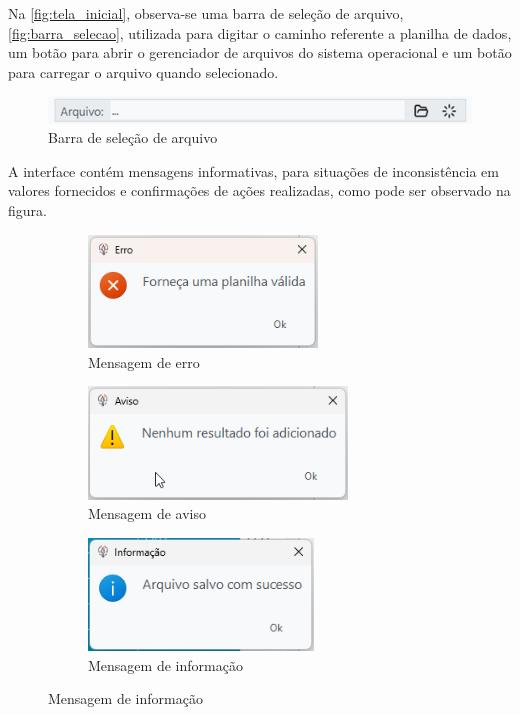 Na \autoref{fig:tela_inicial}, observa-se uma barra de seleção de arquivo, \autoref{fig:barra_selecao}, utilizada para digitar o caminho referente a planilha de dados, um botão para abrir o gerenciador de arquivos do sistema operacional e um botão para carregar o arquivo quando selecionado.

\begin{figure}[H]
	\centering
	\caption{Barra de seleção de arquivo}
	\label{fig:barra_selecao}
	\includegraphics[width=15cm]{illustrations/figures/barra_selecao.png}
\end{figure}

A interface contém mensagens informativas, para situações de inconsistência em valores fornecidos e confirmações de ações realizadas, como pode ser observado na figura.

\begin{figure}[H]
	\centering
	\caption{Mensagens informativas}
  \label{fig:mensagens_informativas}
	\begin{subfigure}{7.5cm}
		\centering
		\includegraphics[height=3cm]{illustrations/figures/mensagem_erro.png}
		\caption{Mensagem de erro}
		\label{fig:moensagem_erro}
	\end{subfigure}
  \begin{subfigure}{7.5cm}
		\centering
		\includegraphics[height=3cm]{illustrations/figures/mensagem_aviso_resultado.png}
		\caption{Mensagem de aviso}
		\label{fig:moensagem_aviso}
	\end{subfigure}
  \begin{subfigure}{7.5cm}
		\centering
		\includegraphics[height=3cm]{illustrations/figures/mensagem_informacao.png}
		\caption{Mensagem de informação}
		\label{fig:moensagem_informacao}
	\end{subfigure}
\end{figure}

